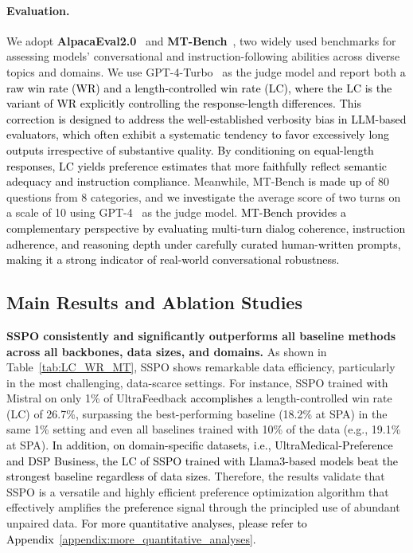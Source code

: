 \documentclass{article} %
\newcommand\fix[1]{\textcolor{black}{#1}}
\newcommand\turnitin[1]{\textcolor{black}{#1}}
\newcommand\rebuttal[1]{\textcolor{black}{#1}}
\begin{document}
\paragraph{Evaluation.} We adopt \textbf{AlpacaEval2.0}~\citep{dubois2025lengthcontrolledalpacaevalsimpleway} and \textbf{MT-Bench}~\citep{zheng2023judgingllmasajudgemtbenchchatbot}, two widely used benchmarks for assessing models' conversational and instruction-following abilities across diverse topics and domains. We use GPT-4-Turbo~\citep{achiam2023gpt} as the judge model and report both \rebuttal{a raw win rate (WR) and a length-controlled win rate (LC), where the LC is the variant of WR explicitly controlling the response-length differences. This correction is designed to address the well-established verbosity bias in LLM-based evaluators, which often exhibit a systematic tendency to favor excessively long outputs irrespective of substantive quality. By conditioning on equal-length responses, LC yields preference estimates that more faithfully reflect semantic adequacy and instruction compliance.} Meanwhile, MT-Bench \turnitin{is made up} of 80 questions from 8 categories, and we \turnitin{investigate} the average score of two turns on a scale of 10 using GPT-4~\citep{achiam2023gpt} as the judge model.
\rebuttal{MT-Bench provides a complementary perspective by evaluating multi-turn dialog coherence, instruction adherence, and reasoning depth under carefully curated human-written prompts, making it a strong indicator of real-world conversational robustness.}



\subsection{Main Results and Ablation Studies}
\noindent\textbf{SSPO consistently and significantly outperforms all baseline methods across all backbones, data sizes, and domains.} As shown in Table~\ref{tab:LC_WR_MT}, SSPO shows remarkable data efficiency, particularly in the most challenging, data-scarce settings. For instance, SSPO trained \fix{with} Mistral on only 1\% of UltraFeedback \turnitin{accomplishes} a length-controlled win rate (LC) of 26.7\%, surpassing the best-performing baseline (18.2\% at SPA) in the same 1\% setting and even all baselines trained with 10\% of the data (e.g., 19.1\% at SPA). \fix{In addition, on domain-specific datasets, i.e., UltraMedical-Preference and DSP Business, the LC of SSPO trained with Llama3-based models beat the strongest baseline regardless of data sizes.} Therefore, the results validate that SSPO is a versatile and highly efficient preference optimization algorithm that effectively amplifies the \fix{preference} signal through the principled use of abundant unpaired data. \rebuttal{For more quantitative analyses, please refer to Appendix~\ref{appendix:more_quantitative_analyses}.}
\end{document}
